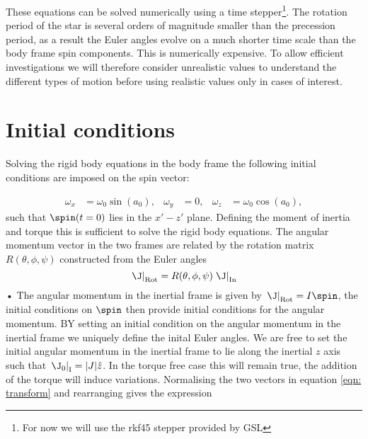 \documentclass[/home/greg/Thesis/main/main.tex]{subfiles}
\begin{document}
These equations can be solved numerically using a time stepper\footnote{For now
we will use the rkf45 stepper provided by GSL}. %
The rotation period of the star is several orders of magnitude smaller than the
precession period, as a result the Euler angles evolve on a much shorter time
scale than the body frame spin components. This is numerically expensive. To
allow efficient investigations we will therefore consider unrealistic values to
understand the different types of motion before using realistic values only in
cases of interest.


\section{Initial conditions}

Solving the rigid body equations in the body frame the following initial
conditions are imposed on the spin vector:

\begin{align}\label{eqn:spin init}
\omega_{x} & = \omega_{0}\sin(a_{0}), & 
\omega_{y} & = 0, & 
\omega_{z} & = \omega_{0}\cos(a_{0}),
\end{align}
such that  $\spin(t=0)$ lies in the $x' - z'$ plane. Defining the moment of
inertia and torque this is sufficient to solve the rigid body equations. The 
angular momentum vector in the two frames are related by the rotation matrix 
$R(\theta, \phi, \psi)$ constructed from the Euler angles
\begin{equation}
\left. \J \right|_{\textrm{Rot}} = R(\theta, \phi, \psi) \left. \J \right|_{\textrm{In} }
\label{eqn: transform}
\end{equation}•
The angular momentum in the inertial frame is given by $\left. \J
\right|_{\textrm{Rot}}= I \spin$, the initial conditions on $\spin$ then
provide initial conditions for the angular momentum.  BY setting an initial
condition on the angular momentum in the inertial frame we uniquely define the
inital Euler angles. We are free to set the initial angular momentum in the
inertial frame to lie along the inertial $z$ axis such that
$\left.\J_{0}\right|_{\textrm{I}} = |J|\hat{z}$. In the torque free case this
will remain true, the addition of the torque will induce variations.
Normalising the two vectors in equation \eqref{eqn: transform} and rearranging
gives the expression
\end{document}
